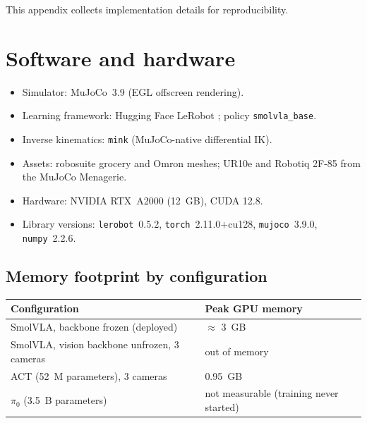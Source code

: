 This appendix collects implementation details for reproducibility.

\section{Software and hardware}
\begin{itemize}
    \item Simulator: MuJoCo~3.9 (EGL offscreen rendering).
    \item Learning framework: Hugging Face LeRobot \parencite{cadene2024lerobot};
    policy \texttt{smolvla\_base}.
    \item Inverse kinematics: \texttt{mink} (MuJoCo-native differential IK).
    \item Assets: robosuite grocery and Omron meshes; UR10e and Robotiq 2F-85 from
    the MuJoCo Menagerie.
    \item Hardware: NVIDIA RTX~A2000 (12~GB), CUDA 12.8.
    \item Library versions: \texttt{lerobot}~0.5.2, \texttt{torch}~2.11.0+cu128,
    \texttt{mujoco}~3.9.0, \texttt{numpy}~2.2.6.
\end{itemize}

\subsection*{Memory footprint by configuration}
\begin{center}
\begin{tabular}{ll}
\toprule
Configuration & Peak GPU memory \\
\midrule
SmolVLA, backbone frozen (deployed) & $\approx$ 3~GB \\
SmolVLA, vision backbone unfrozen, 3 cameras & out of memory \\
ACT (52~M parameters), 3 cameras & 0.95~GB \\
$\pi_0$ (3.5~B parameters) & not measurable (training never started) \\
\bottomrule
\end{tabular}
\end{center}

